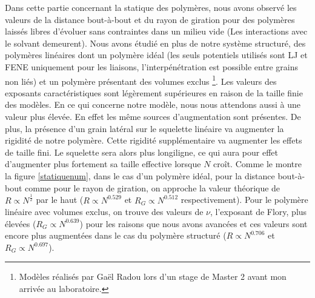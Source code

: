 Dans cette partie concernant la statique des polymères, nous avons observé les valeurs de la distance bout-à-bout et du rayon de giration pour des polymères laissés libres d'évoluer sans contraintes dans un milieu vide (Les interactions avec le solvant demeurent). Nous avons étudié en plus de notre système structuré, des polymères linéaires dont un polymère idéal (les seuls potentiels utilisés sont LJ et FENE uniquement pour les liaisons, l'interpénétration est possible entre grains non liés) et un polymère présentant des volumes exclus \footnote{Modèles réalisés par Gaël Radou lors d'un stage de Master 2 avant mon arrivée au laboratoire.}. Les valeurs des exposants caractéristiques sont légèrement supérieures en raison de la taille finie des modèles. En ce qui concerne notre modèle, nous nous attendons aussi à une valeur plus élevée. En effet les même sources d'augmentation sont présentes. De plus, la présence d'un grain latéral sur le squelette linéaire va augmenter la rigidité de notre polymère. Cette rigidité supplémentaire va augmenter les effets de taille fini. Le squelette sera alors plus longiligne, ce qui aura pour effet d'augmenter plus fortement sa taille effective lorsque $N$ croît. Comme le montre la figure  \ref{statiquenum}, dans le cas d'un polymère idéal, pour la distance bout-à-bout comme pour le rayon de giration, on approche la valeur théorique de $R\propto N^\frac{1}{2}$ par le haut ($R\propto N^{0.529}$ et $R_G\propto N^{0.512}$ respectivement). Pour le polymère linéaire avec volumes exclus, on trouve des valeurs de $\nu$, l'exposant de Flory, plus élevées ($R_G \propto N^{0.639}$) pour les raisons que nous avons avancées et ces valeurs sont encore plus augmentées dans le cas du polymère structuré ($R\propto N^{0.706}$ et $R_G \propto N^{0.697}$). \\


